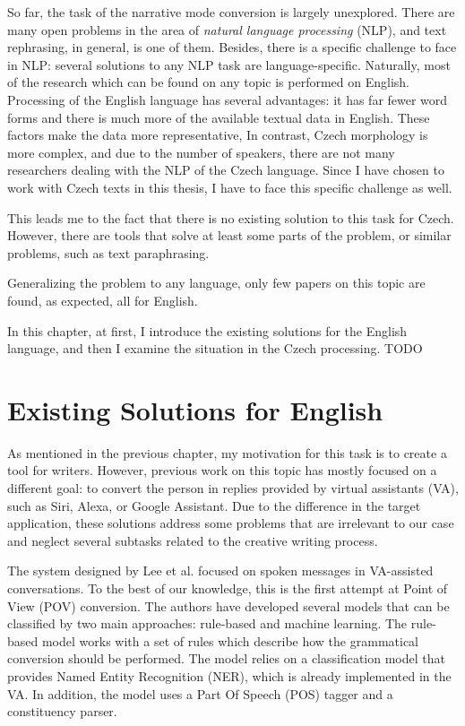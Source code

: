 So far, the task of the narrative mode conversion is largely unexplored. There are many open problems in the area of \emph{natural language processing} (NLP), and text rephrasing, in general, is one of them. Besides, there is a specific challenge to face in NLP: several solutions to any NLP task are language-specific. Naturally, most of the research which can be found on any topic is performed on English. Processing of the English language has several advantages: it has far fewer word forms and there is much more of the available textual data in English. These factors make the data more representative, In contrast, Czech morphology is more complex, and due to the number of speakers, there are not many researchers dealing with the NLP  of the Czech language. Since I have chosen to work with Czech texts in this thesis, I have to face this specific challenge as well.

This leads me to the fact that there is no existing solution to this task for Czech. However, there are tools that solve at least some parts of the problem, or similar problems, such as text paraphrasing.

Generalizing the problem to any language, only few papers on this topic are found, as expected, all for English.

In this chapter, at first, I introduce the existing solutions for the English language, and then I examine the situation in the Czech processing. TODO

\section{Existing Solutions for English}

As mentioned in the previous chapter, my motivation for this task is to create a tool for writers. However, previous work on this topic has mostly focused on a different goal: to convert the person in replies provided by virtual assistants (VA), such as Siri, Alexa, or Google Assistant. Due to the difference in the target application, these solutions address some problems that are irrelevant to our case and neglect several subtasks related to the creative writing process.

The system designed by Lee et al. \cite{lee2020converting} focused on spoken messages in VA-assisted conversations. To the best of our knowledge, this is the first attempt at Point of View (POV) conversion. The authors have developed several models that can be classified by two main approaches: rule-based and machine learning. The rule-based model works with a set of rules which describe how the grammatical conversion should be performed. The model relies on a classification model that provides Named Entity Recognition (NER), which is already implemented in the VA. In addition, the model uses a Part Of Speech (POS) tagger and a constituency parser.

